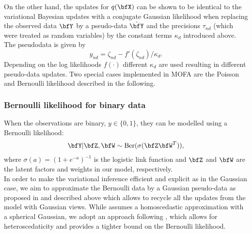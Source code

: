 On the other hand, the updates for $q(\bfX)$ can be shown to be identical to the variational Bayesian updates with a conjugate Gaussian likelihood when replacing the observed data $\bfY$ by a pseudo-data $\hat{\bfY}$ and the precisions $\tau_{nd}$ (which were treated as random variables) by the constant terms $\kappa_d$ introduced above.\\
The pseudodata is given by
\begin{equation*}
\hat{y}_{nd} = \zeta_{nd} - f'(\zeta_{nd})/\kappa_d.
\end{equation*}
Depending on the log likelihoods $f(\cdot)$ different $\kappa_d$ are used resulting in different pseudo-data updates. Two special cases implemented in MOFA are the Poisson and Bernoulli likelihood described in the following.

\subsubsection*{Bernoulli likelihood for binary data}
When the observations are binary, $y \in \{0,1\}$, they can be modelled using a Bernoulli likelihood:
\begin{equation*}
\bfY|\bfZ,\bfW \sim \text{Ber}(\sigma(\bfZ\bfW^T)),
\end{equation*} where $\sigma(a)=(1+e^{-a})^{-1}$ is the logistic link function and $\bfZ$ and $\bfW$ are the latent factors and weights in our model, respectively.\\
In order to make the variational  inference efficient and explicit as in the Gaussian case, we aim to approximate the Bernoulli data by a Gaussian pseudo-data as proposed in \cite{Seeger2012} and described above which allows to recycle all the updates from the model with Gaussian views. While \cite{Seeger2012} assumes a homoscedastic approximation with a spherical Gaussian, we adopt an approach following \cite{Jaakkola2000}, which allows for heteroscedaticity and provides a tighter bound on the Bernoulli likelihood.\\
